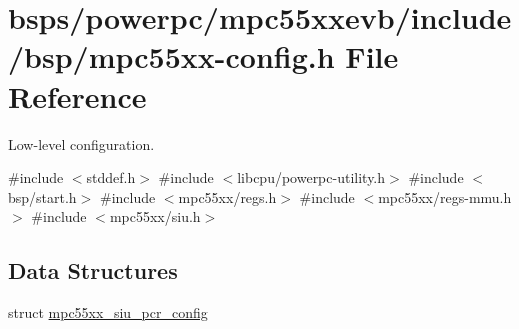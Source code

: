 \hypertarget{mpc55xx-config_8h}{}\section{bsps/powerpc/mpc55xxevb/include/bsp/mpc55xx-\/config.h File Reference}
\label{mpc55xx-config_8h}


Low-\/level configuration.  


{\ttfamily \#include $<$stddef.\+h$>$}\newline
{\ttfamily \#include $<$libcpu/powerpc-\/utility.\+h$>$}\newline
{\ttfamily \#include $<$bsp/start.\+h$>$}\newline
{\ttfamily \#include $<$mpc55xx/regs.\+h$>$}\newline
{\ttfamily \#include $<$mpc55xx/regs-\/mmu.\+h$>$}\newline
{\ttfamily \#include $<$mpc55xx/siu.\+h$>$}\newline
\subsection*{Data Structures}
\begin{DoxyCompactItemize}
\item 
struct \mbox{\hyperlink{structmpc55xx__siu__pcr__config}{mpc55xx\+\_\+siu\+\_\+pcr\+\_\+config}}
\end{DoxyCompactItemize}

